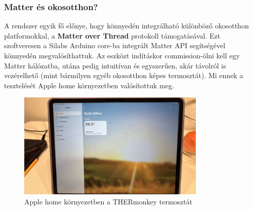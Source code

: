 \documentclass[12pt,a4paper]{article}
\begin{document}
\subsubsection{Matter és okosotthon?}
A rendszer egyik fő előnye, hogy könnyedén integrálható különböző okosotthon platformokkal, a \textbf{Matter over Thread} protokoll támogatásával.
Ezt szoftveresen a Silabs Arduino core-ba integrált Matter API segítségével könnyedén megvalósíthattuk. Az eszközt indításkor commission-ölni kell egy
Matter hálózatba, utána pedig intuitívan és egyszerűen, akár távolról is vezérelhető (mint bármilyen egyéb okosotthon képes termosztát). Mi ennek a tesztelését
Apple home környezetben valósítottuk meg.

\begin{figure}[H]
    \centering
    \includegraphics[width=0.8\textwidth]{figures/apple__home.jpg}
    \caption{Apple home környezetben a THERmonkey termosztát}
    \label{fig:rirs}
\end{figure}

\pagebreak
\end{document}
